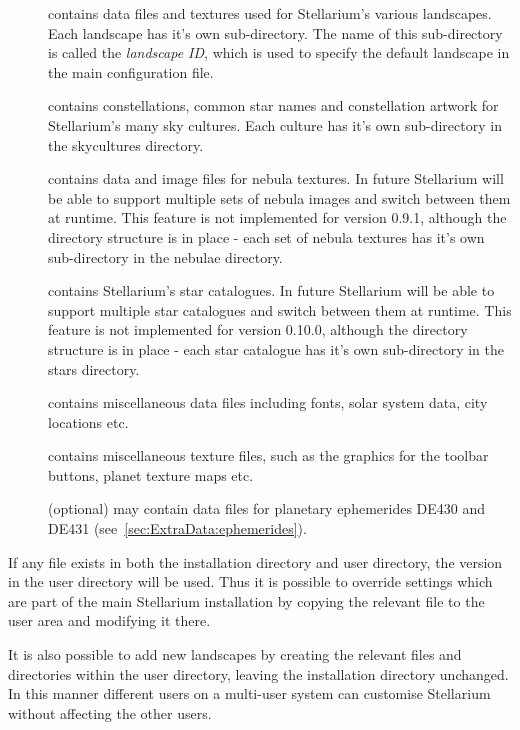 \begin{description}
\item[] contains data files and textures used for
  Stellarium's various landscapes. Each landscape has it's own
  sub-directory. The name of this sub-directory is called the
  \emph{landscape ID}, which is used to specify the default landscape in
  the main configuration file.
\item[] contains constellations, common star names and
  constellation artwork for Stellarium's many sky cultures. Each culture
  has it's own sub-directory in the skycultures directory.
\item[] contains data and image files for nebula textures.
  In future Stellarium will be able to support multiple sets of nebula
  images and switch between them at runtime. This feature is not
  implemented for version 0.9.1, although the directory structure is in
  place - each set of nebula textures has it's own sub-directory in the
  nebulae directory.
\item[] contains Stellarium's star catalogues. In future
  Stellarium will be able to support multiple star catalogues and switch
  between them at runtime. This feature is not implemented for version
  0.10.0, although the directory structure is in place - each star
  catalogue has it's own sub-directory in the stars directory.
\item[] contains miscellaneous data files including fonts,
  solar system data, city locations etc.
\item[] contains miscellaneous texture files, such as the
  graphics for the toolbar buttons, planet texture maps etc.
\item[] (optional) may contain data files for planetary
  ephemerides DE430 and DE431 (see~\ref{sec:ExtraData:ephemerides}).
\end{description}

If any file exists in both the installation directory and user
directory, the version in the user directory will be used. Thus it is
possible to override settings which are part of the main Stellarium
installation by copying the relevant file to the user area and modifying
it there.

It is also possible to add new landscapes by creating the relevant files
and directories within the user directory, leaving the installation
directory unchanged. In this manner different users on a multi-user
system can customise Stellarium without affecting the other users.

